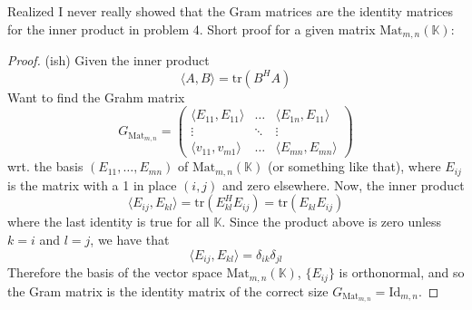 \documentclass[a4paper,11pt]{article}
\begin{document}
Realized I never really showed that the Gram matrices are the identity matrices for the inner product in problem 4.
Short proof for a given matrix $\text{Mat}_{m, n}(\mathbb{K})$:
\begin{proof}
(ish) Given the inner product 
\[
    \langle A, B \rangle = \text{tr}(B^H A)
\]
Want to find the Grahm matrix
\[
    G_{\text{Mat}_{m, n}} = \begin{pmatrix}
        \langle E_{11}, E_{11} \rangle & \dots & \langle E_{1n}, E_{11} \rangle \\
        \vdots  & \ddots & \vdots \\
        \langle v_{11}, v_{m1} \rangle & \dots & \langle E_{mn}, E_{mn} \rangle
    \end{pmatrix}
\]
wrt. the basis $(E_{11}, \dots, E_{mn})$ of $\text{Mat}_{m, n}(\mathbb{K})$ (or something like that),
where $E_{ij}$ is the matrix with a 1 in place $(i, j)$ and zero elsewhere.
Now, the inner product 
\[
    \langle E_{ij}, E_{kl} \rangle = \text{tr}(E^H_{kl}E_{ij}) = \text{tr}(E_{kl}E_{ij})
\]
where the last identity is true for all $\mathbb{K}$. Since the product above is zero unless $k = i$ and $l = j$,
we have that
\[
    \langle E_{ij}, E_{kl} \rangle = \delta_{ik} \delta_{jl}
\]
Therefore the basis of the vector space $\text{Mat}_{m, n}(\mathbb{K})$, $\{E_{ij}\}$ is orthonormal, and 
so the Gram matrix is the identity matrix of the correct size $G_{\text{Mat}_{m, n}} = \text{Id}_{m, n}$.
\end{proof}
\end{document}
